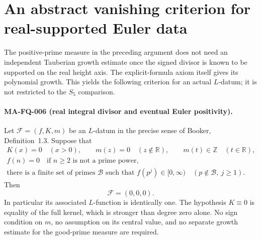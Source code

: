 \section{An abstract vanishing criterion for real-supported Euler data}
\label{sec:s5-crystal-criterion}

The positive-prime measure in the preceding argument does not need
an independent Tauberian growth estimate once the signed divisor is
known to be supported on the real height axis. The explicit-formula
axiom itself gives its polynomial growth. This yields the following
criterion for an actual $L$-datum; it is not restricted to the
$S_5$ comparison.

\paragraph{MA-FQ-006 (real integral divisor and eventual Euler positivity).}
Let $\mathcal F=(f,K,m)$ be an $L$-datum in the precise sense of
Booker, Definition~1.3. Suppose that
\[
 \begin{gathered}
 K(x)=0\quad(x>0),\qquad
 m(z)=0\quad(z\notin\mathbb R),\qquad
 m(t)\in\mathbb Z\quad(t\in\mathbb R),\\
 f(n)=0\quad\text{if }n\ge2\text{ is not a prime power},\\
 \text{there is a finite set of primes }\mathcal B
 \text{ such that }
 f(p^j)\in[0,\infty)
       \quad(p\notin\mathcal B,\ j\ge1).
 \end{gathered}
 \tag{MA-FQ.40}
\]
Then
\[
                  \mathcal F=(0,0,0).
 \tag{MA-FQ.41}
\]
In particular its associated $L$-function is identically one.
The hypothesis $K\equiv0$ is equality of the full kernel,
which is stronger than degree zero alone. No sign condition
on $m$, no assumption on its central value, and no separate
growth estimate for the good-prime measure are required.

